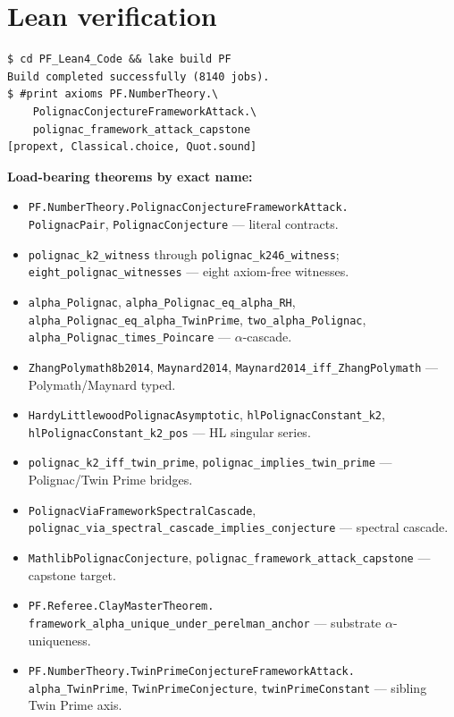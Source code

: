 \documentclass[11pt,a4paper]{article}
\theoremstyle{plain}
\theoremstyle{definition}
\begin{document}
\section{Lean verification}
\label{sec:lean}

\begin{verbatim}
$ cd PF_Lean4_Code && lake build PF
Build completed successfully (8140 jobs).
$ #print axioms PF.NumberTheory.\
    PolignacConjectureFrameworkAttack.\
    polignac_framework_attack_capstone
[propext, Classical.choice, Quot.sound]
\end{verbatim}

\noindent\textbf{Load-bearing theorems by exact name:}

\begin{itemize}[leftmargin=*,nosep]
\item \texttt{PF.NumberTheory.PolignacConjectureFrameworkAttack.\\
  PolignacPair}, \texttt{PolignacConjecture} --- literal contracts.
\item \texttt{polignac\_k2\_witness} through
  \texttt{polignac\_k246\_witness}; \texttt{eight\_polignac\_witnesses}
  --- eight axiom-free witnesses.
\item \texttt{alpha\_Polignac}, \texttt{alpha\_Polignac\_eq\_alpha\_RH},
  \texttt{alpha\_Polignac\_eq\_alpha\_TwinPrime},
  \texttt{two\_alpha\_Polignac},
  \texttt{alpha\_Polignac\_times\_Poincare} --- $\alpha$-cascade.
\item \texttt{ZhangPolymath8b2014},
  \texttt{Maynard2014},
  \texttt{Maynard2014\_iff\_ZhangPolymath} --- Polymath/Maynard typed.
\item \texttt{HardyLittlewoodPolignacAsymptotic},
  \texttt{hlPolignacConstant\_k2},
  \texttt{hlPolignacConstant\_k2\_pos} --- HL singular series.
\item \texttt{polignac\_k2\_iff\_twin\_prime},
  \texttt{polignac\_implies\_twin\_prime} --- Polignac/Twin Prime
  bridges.
\item \texttt{PolignacViaFrameworkSpectralCascade},
  \texttt{polignac\_via\_spectral\_cascade\_implies\_conjecture}
  --- spectral cascade.
\item \texttt{MathlibPolignacConjecture},
  \texttt{polignac\_framework\_attack\_capstone} --- capstone target.
\item \texttt{PF.Referee.ClayMasterTheorem.\\
  framework\_alpha\_unique\_under\_perelman\_anchor}
  --- substrate $\alpha$-uniqueness.
\item \texttt{PF.NumberTheory.TwinPrimeConjectureFrameworkAttack.\\
  alpha\_TwinPrime},
  \texttt{TwinPrimeConjecture},
  \texttt{twinPrimeConstant} --- sibling Twin Prime axis.
\end{itemize}
\end{document}
